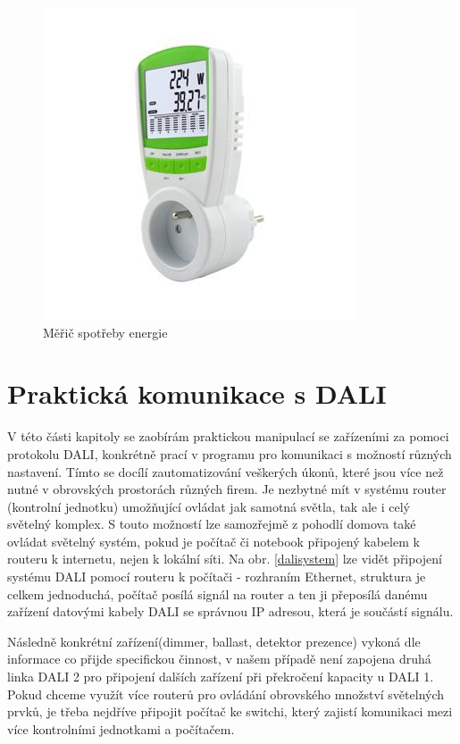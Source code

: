 \documentclass[FM,RP]{tulthesis}
\begin{document}
    \begin{figure}[h]
   	\begin{center}
   		\includegraphics[scale=0.75]{_thb_4731650_obr.jpg}
   		\caption{Měřič spotřeby energie}
   		\label{mericenergie}
   	\end{center}
   \end{figure}
 
   \chapter {Praktická komunikace s DALI}
   V této části kapitoly se zaobírám praktickou manipulací se zařízeními za pomoci protokolu DALI, konkrétně prací v programu pro komunikaci s možností různých nastavení. Tímto se docílí zautomatizování veškerých úkonů, které jsou více než nutné v obrovských prostorách různých firem. Je nezbytné mít v systému router (kontrolní jednotku) umožňující ovládat jak samotná světla, tak ale i celý světelný komplex.
   S touto možností lze samozřejmě z pohodlí domova také ovládat světelný systém, pokud je počítač či notebook připojený kabelem k routeru k internetu, nejen k lokální síti. Na obr. \ref{dalisystem}  lze vidět připojení systému DALI pomocí routeru k počítači - rozhraním Ethernet, struktura je celkem jednoduchá, počítač posílá signál na router a ten ji přeposílá danému zařízení datovými kabely DALI se správnou IP adresou, která je součástí signálu. 
   
   Následně konkrétní zařízení(dimmer, ballast, detektor prezence)  vykoná dle informace co přijde specifickou činnost, v našem případě není zapojena druhá linka DALI 2 pro připojení dalších zařízení při překročení kapacity u DALI 1. Pokud chceme využít více routerů pro ovládání obrovského množství světelných prvků, je třeba nejdříve připojit počítač ke switchi, který zajistí komunikaci mezi více kontrolními jednotkami a počítačem. 
\end{document}
